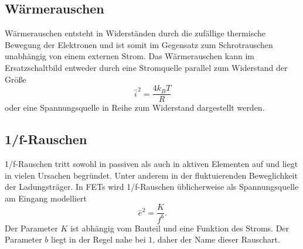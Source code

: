 \subsection*{Wärmerauschen}
Wärmerauschen entsteht in Widerständen durch die zufällige thermische Bewegung der Elektronen und ist somit im Gegensatz zum Schrotrauschen unabhängig von einem externen Strom.
Das Wärmerauschen kann im Ersatzschaltbild entweder durch eine Stromquelle parallel zum Widerstand der Größe
\begin{equation}
\stackrel{-}{i}^2 = \frac{4k_B T}{R}
\end{equation}
oder eine Spannungsquelle in Reihe zum Widerstand dargestellt werden.

\subsection*{1/f-Rauschen}
1/f-Rauschen tritt sowohl in passiven als auch in aktiven Elementen auf und liegt in vielen Ursachen begründet.
Unter anderem in der fluktuierenden Beweglichkeit der Ladungsträger.
In FETs wird 1/f-Rauschen üblicherweise als Spannungsquelle am Eingang modelliert
\begin{equation}
\stackrel{-}{e}^2 = \frac{K}{f^b}.
\end{equation}
Der Parameter $K$ ist abhängig vom Bauteil und eine Funktion des Stroms.
Der Parameter $b$ liegt in der Regel nahe bei $1$, daher der Name dieser Rauschart.

